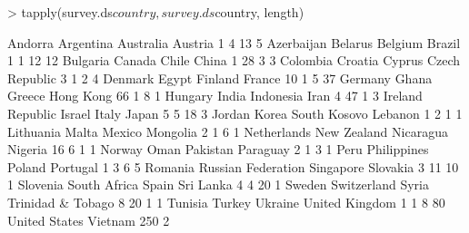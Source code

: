 \documentclass[9pt]{article}
\begin{document}
\begin{Schunk}
\begin{Sinput}
> tapply(survey.ds$country, survey.ds$country, length)
\end{Sinput}
\begin{Soutput}
           Andorra          Argentina          Australia            Austria 
                 1                  4                 13                  5 
        Azerbaijan            Belarus            Belgium             Brazil 
                 1                  1                 12                 12 
          Bulgaria             Canada              Chile              China 
                 1                 28                  3                  3 
          Colombia            Croatia             Cyprus     Czech Republic 
                 3                  1                  2                  4 
           Denmark              Egypt            Finland             France 
                10                  1                  5                 37 
           Germany              Ghana             Greece          Hong Kong 
                66                  1                  8                  1 
           Hungary              India          Indonesia               Iran 
                 4                 47                  1                  3 
Ireland {Republic}             Israel              Italy              Japan 
                 5                  5                 18                  3 
            Jordan        Korea South             Kosovo            Lebanon 
                 1                  2                  1                  1 
         Lithuania              Malta             Mexico           Mongolia 
                 2                  1                  6                  1 
       Netherlands        New Zealand          Nicaragua            Nigeria 
                16                  6                  1                  1 
            Norway               Oman           Pakistan           Paraguay 
                 2                  1                  3                  1 
              Peru        Philippines             Poland           Portugal 
                 1                  3                  6                  5 
           Romania Russian Federation          Singapore           Slovakia 
                 3                 11                 10                  1 
          Slovenia       South Africa              Spain          Sri Lanka 
                 4                  4                 20                  1 
            Sweden        Switzerland              Syria  Trinidad & Tobago 
                 8                 20                  1                  1 
           Tunisia             Turkey            Ukraine     United Kingdom 
                 1                  1                  8                 80 
     United States            Vietnam 
               250                  2 
\end{Soutput}
\end{Schunk}
\end{document}
